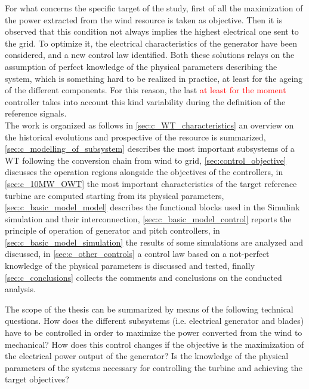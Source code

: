 For what concerns the specific target of the study, first of all the maximization of the power extracted from the wind resource is taken as objective. Then it is observed that this condition not always implies the highest electrical one sent to the grid. To optimize it, the electrical characteristics of the generator have been considered, and a new control law identified. Both these solutions relays on the assumption of perfect knowledge of the physical parameters describing the system, which is something hard to be realized in practice, at least for the ageing of the different components. For this reason, the last \textcolor{red}{at least for the moment} controller takes into account this kind variability during the definition of the reference signals. \\
The work is organized as follows in \autoref{sec:c_WT_characteristics} an overview on the historical evolutions and prospective of the resource is summarized, \autoref{sec:c_modelling_of_subsystem} describes the most important subsystems of a WT following the conversion chain from wind to grid, \autoref{sec:control_objective} discusses the operation regions alongside the objectives of the controllers, in \autoref{sec:c_10MW_OWT} the most important characteristics of the target reference turbine are computed starting from its physical parameters, \autoref{sec:c_basic_model_model} describes the functional blocks used in the Simulink simulation and their interconnection, \autoref{sec:c_basic_model_control} reports the principle of operation of generator and pitch controllers, in \autoref{sec:c_basic_model_simulation} the results of some simulations are analyzed and discussed, in \autoref{sec:c_other_controls} a control law based on a not-perfect knowledge of the physical parameters is discussed and tested, finally \autoref{sec:c_conclusions} collects the comments and conclusions on the conducted analysis.

The scope of the thesis can be summarized by means of the following technical questions. How does the different subsystems (i.e. electrical generator and blades) have to be controlled in order to maximize the power converted from the wind to mechanical? How does this control changes if the objective is the maximization of the electrical power output of the generator? Is the knowledge of the physical parameters of the systems necessary for controlling the turbine and achieving the target objectives? 

